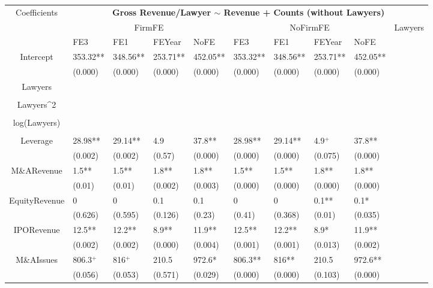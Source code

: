 \documentclass{article}
\begin{document}
\begin{table}[H]
\centering
\begin{tabular}{|clllllllll|}
\hline
\multirow{3}{*}{Coefficients} & \multicolumn{9}{c|}{\textbf{Gross Revenue/Lawyer $\sim$ Revenue + Counts (without Lawyers)}} \\
\cline{2-10}
& \multicolumn{4}{c}{FirmFE} & \multicolumn{4}{c}{NoFirmFE} & \multirow{2}{*}{Lawyers} \\
\cline{2-9}
& FE3 & FE1 & FEYear & NoFE & FE3 & FE1 & FEYear & NoFE &  \\
\hline
 
Intercept & 353.32** & 348.56** & 253.71** & 452.05** & 353.32** & 348.56** & 253.71** & 452.05** & \\ 
   & (0.000) & (0.000) & (0.000) & (0.000) & (0.000) & (0.000) & (0.000) & (0.000) & \\ 
  Lawyers &  &  &  &  &  &  &  &  & \\ 
   &  &  &  &  &  &  &  &  & \\ 
  Lawyers^2 &  &  &  &  &  &  &  &  & \\ 
   &  &  &  &  &  &  &  &  & \\ 
  log(Lawyers) &  &  &  &  &  &  &  &  & \\ 
   &  &  &  &  &  &  &  &  & \\ 
  Leverage & 28.98** & 29.14** & 4.9 & 37.8** & 28.98** & 29.14** & 4.9$^{+}$ & 37.8** & \\ 
   & (0.002) & (0.002) & (0.57) & (0.000) & (0.000) & (0.000) & (0.075) & (0.000) & \\ 
  M\&ARevenue & 1.5** & 1.5** & 1.8** & 1.8** & 1.5** & 1.5** & 1.8** & 1.8** & \\ 
   & (0.01) & (0.01) & (0.002) & (0.003) & (0.000) & (0.000) & (0.000) & (0.000) & \\ 
  EquityRevenue & 0 & 0 & 0.1 & 0.1 & 0 & 0 & 0.1** & 0.1* & \\ 
   & (0.626) & (0.595) & (0.126) & (0.23) & (0.41) & (0.368) & (0.01) & (0.035) & \\ 
  IPORevenue & 12.5** & 12.2** & 8.9** & 11.9** & 12.5** & 12.2** & 8.9* & 11.9** & \\ 
   & (0.002) & (0.002) & (0.000) & (0.004) & (0.001) & (0.001) & (0.013) & (0.002) & \\ 
  M\&AIssues & 806.3$^{+}$ & 816$^{+}$ & 210.5 & 972.6* & 806.3** & 816** & 210.5 & 972.6** & \\ 
   & (0.056) & (0.053) & (0.571) & (0.029) & (0.000) & (0.000) & (0.103) & (0.000) & \\ 

\end{tabular}
\end{table}
\end{document}
